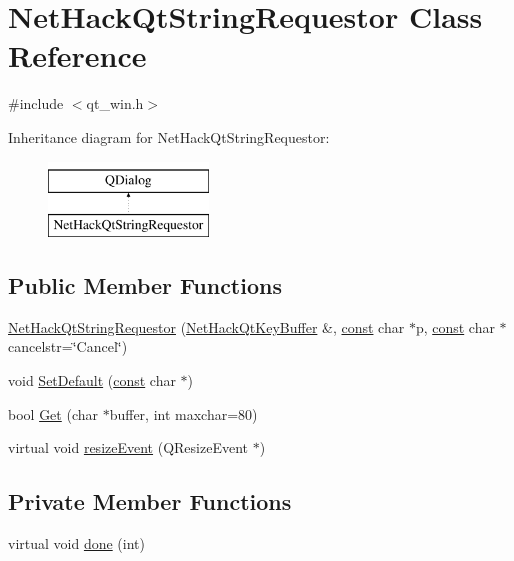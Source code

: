 \hypertarget{classNetHackQtStringRequestor}{\section{Net\+Hack\+Qt\+String\+Requestor Class Reference}
\label{classNetHackQtStringRequestor}
}


{\ttfamily \#include $<$qt\+\_\+win.\+h$>$}

Inheritance diagram for Net\+Hack\+Qt\+String\+Requestor\+:\begin{figure}[H]
\begin{center}
\leavevmode
\includegraphics[height=2.000000cm]{classNetHackQtStringRequestor}
\end{center}
\end{figure}
\subsection*{Public Member Functions}
\begin{DoxyCompactItemize}
\item 
\hyperlink{classNetHackQtStringRequestor_a113d126ee5dd952e8d0d398e4fd9d70d}{Net\+Hack\+Qt\+String\+Requestor} (\hyperlink{classNetHackQtKeyBuffer}{Net\+Hack\+Qt\+Key\+Buffer} \&, \hyperlink{tradstdc_8h_a2c212835823e3c54a8ab6d95c652660e}{const} char $\ast$p, \hyperlink{tradstdc_8h_a2c212835823e3c54a8ab6d95c652660e}{const} char $\ast$cancelstr=\char`\"{}Cancel\char`\"{})
\item 
void \hyperlink{classNetHackQtStringRequestor_ada97e8d8200a5ee31bc22bf887eaaf01}{Set\+Default} (\hyperlink{tradstdc_8h_a2c212835823e3c54a8ab6d95c652660e}{const} char $\ast$)
\item 
bool \hyperlink{classNetHackQtStringRequestor_ad99ebb85019863190aa5c82e74923e2f}{Get} (char $\ast$buffer, int maxchar=80)
\item 
virtual void \hyperlink{classNetHackQtStringRequestor_aac565d554bba3c62143dc65ec338dc2d}{resize\+Event} (Q\+Resize\+Event $\ast$)
\end{DoxyCompactItemize}
\subsection*{Private Member Functions}
\begin{DoxyCompactItemize}
\item 
virtual void \hyperlink{classNetHackQtStringRequestor_aec6e5328e00e1a45fa965c1542a25afc}{done} (int)
\end{DoxyCompactItemize}

